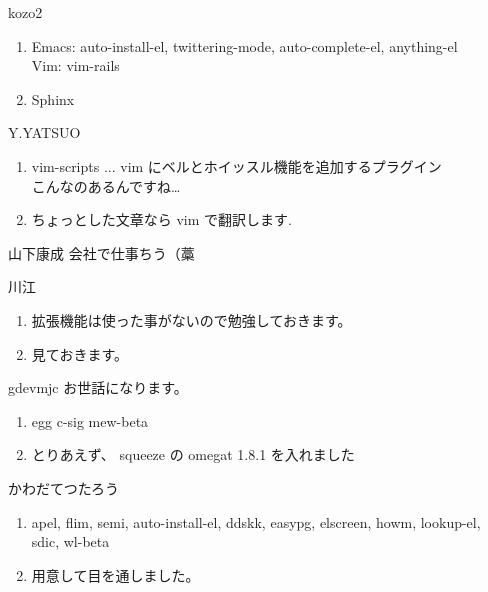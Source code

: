 \documentclass[cjk,dvipdfmx,12pt,%
hyperref={bookmarks=true,bookmarksnumbered=true,bookmarksopen=false,%
colorlinks=false,%
pdftitle={第 52 回 関西 Debian 勉強会},%
pdfauthor={倉敷・のがた・佐々木},%
pdfsubject={資料},%
}]{beamer}
\begin{document}

\begin{frame}{ kozo2 }
\begin{enumerate}
\item Emacs: auto-install-el, twittering-mode, auto-complete-el, anything-el\\
Vim: vim-rails
\item Sphinx
\end{enumerate}
\end{frame}

\begin{frame}{ Y.YATSUO }
\begin{enumerate}
\item vim-scripts ... vim にベルとホイッスル機能を追加するプラグイン\\こんなのあるんですね…
\item ちょっとした文章なら vim で翻訳します.
\end{enumerate}
\end{frame}

\begin{frame}{ 山下康成 }
会社で仕事ちう（藁
\end{frame}

\begin{frame}{ 川江 }
\begin{enumerate}
\item 拡張機能は使った事がないので勉強しておきます。
\item 見ておきます。
\end{enumerate}
\end{frame}

\begin{frame}{ gdevmjc }
お世話になります。
\begin{enumerate}
\item egg c-sig mew-beta
\item とりあえず、 squeeze の omegat 1.8.1 を入れました
\end{enumerate}
\end{frame}

\begin{frame}{ かわだてつたろう }
\begin{enumerate}
\item apel, flim, semi, auto-install-el, ddskk, easypg, elscreen, howm, lookup-el, sdic, wl-beta
\item 用意して目を通しました。
\end{enumerate}
\end{frame}
\end{document}
